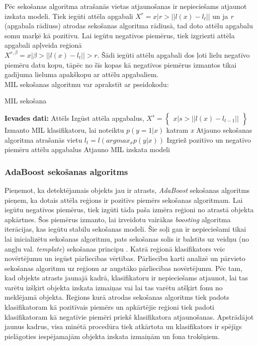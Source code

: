 Pēc sekošanas algoritma atrašanās vietas atjaunošanas ir nepieciešams atjaunot izskata modeli. Tiek iegūti attēla apgabali $ X^r =
x|r > ||l(x)-l_t||
$ un ja \textit{r} (apgabala rādiuss) atrodas sekošanas algoritma rādiusā, tad doto attēlu apgabalu somu marķē kā pozitīvu. Lai iegūtu negatīvos piemērus, tiek izgriezti attēla apgabali apļveida reģionā\\ $X^{r,\beta} = 
x|\beta > || l(x) - l_t|| > r$. Šādi iegūti attēlu apgabali dos ļoti lielu negatīvo piemēru datu kopu, tāpēc no šīs kopas kā negatīvos piemērus izmantos tikai gadījuma lieluma apakškopu ar attēlu apgabaliem\cite{babenko2009visual}.\\ MIL sekošanas algoritmu var aprakstīt ar pseidokodu:
\begin{algorithm}
	\caption{MIL sekošana}\label{euclid}
	\begin{algorithmic}[1]
		\item[\textbf{Ievades dati:}] Attēls
		\State Izgūst attēla apgabalus, $ 
		X^s = \left\{\begin{array}{lr}
		x|s > || l(x) - l_{t-1} ||
		\end{array}\right\} $
		\State Izmanto MIL klasifikatoru, lai noteiktu $p(y=1|x)$ katram \textit{x}
		\State Atjauno sekošanas algoritma atrašanās vietu $l_t = l (argmax_{x} p(y|x))$
		\State Izgriež pozitīvo un negatīvo piemēru attēlu apgabalus
		\State Atjauno MIL izskata modeli
	\end{algorithmic}
\end{algorithm}
\subsubsection{AdaBoost sekošanas algoritms}
Pieņemot, ka detektējamais objekts jau ir atrasts, \textit{AdaBoost} sekošanas algoritms pieņem, ka dotais attēla reģions ir pozitīvs piemērs sekošanas algoritmam. Lai iegūtu negatīvos piemērus, tiek izgūti tāda paša izmēra reģioni no atrastā objekta apkārtnes. Šos piemērus izmanto, lai izveidotu vairākas \textit{boosting} algoritma iterācijas, kas iegūtu stabilu sekošanas modeli. Šie soļi gan ir nepieciešami tikai lai inicializētu sekošanas algoritmu, pats sekošanas solis ir balstīts uz veidņu (no angļu val. \textit{template}) sekošanas principu \cite{hager1998efficient}. Katrā reģionā klasifikators veic novērtējumu un iegūst pārliecības vērtības. Pārliecību karti analizē un pārvieto sekošanas algoritmu uz reģionu ar augstāko pārliecības novērtējumu. Pēc tam, kad objekts atrasts jaunajā kadrā, klasifikatoru ir nepieciešams atjaunot, lai tas varētu izšķirt objekta izskata izmaiņas vai lai tas varētu atšķirt fonu no meklējamā objekta. Reģions kurā atrodas sekošanas algoritms tiek padots klasifikatoram kā pozitīvais piemērs un apkārtējie reģioni tiek padoti klasifikatoram kā negatīvie piemēri priekš klasifikatora atjaunošanas. Apstrādājot jaunus kadrus, visa minētā procedūra tiek atkārtota un klasifikators ir spējīgs pielāgoties iespējamajām objekta izskata izmaiņām un fona trokšņiem.

